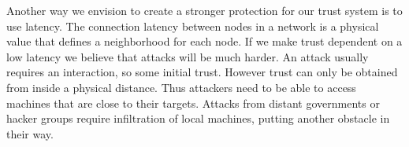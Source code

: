 Another way we envision to create a stronger protection for our trust system is to use latency. The 
connection latency between nodes in a network is a physical value that defines a neighborhood for  
each node. If we make trust dependent on a low latency we believe that attacks will be much harder.
An attack usually requires an interaction, so some initial trust. However trust can only be obtained
from inside a physical distance. Thus attackers need to be able to access machines that are close
to their targets. Attacks from distant governments or hacker groups require infiltration of local
machines, putting another obstacle in their way.






